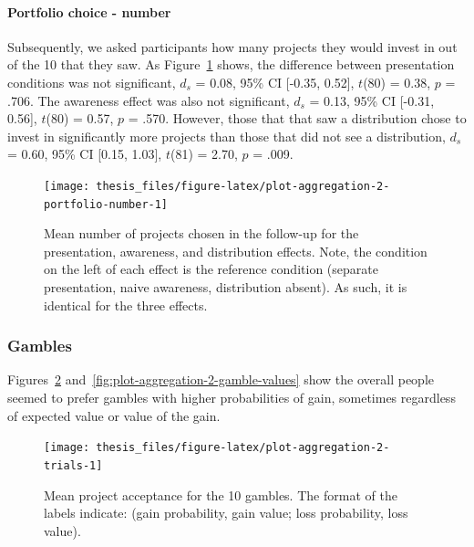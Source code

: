 \documentclass[a4paper, nobind, dvipsnames]{templates/ociamthesis}
\theoremstyle{definition}
\theoremstyle{definition}
\theoremstyle{definition}
\theoremstyle{definition}
\theoremstyle{remark}
\begin{document}
\hypertarget{portfolio-choice---number}{%
\paragraph{Portfolio choice - number}\label{portfolio-choice---number}}

Subsequently, we asked participants how many projects they would invest in out
of the 10 that they saw. As
Figure~\ref{fig:plot-aggregation-2-portfolio-number} shows, the difference
between presentation conditions was not significant,
\(d_s\) = 0.08, 95\% CI {[}-0.35, 0.52{]}, \(t\)(80) = 0.38, \(p\) = .706. The awareness effect
was also not significant, \(d_s\) = 0.13, 95\% CI {[}-0.31, 0.56{]}, \(t\)(80) = 0.57, \(p\) = .570.
However, those that that saw a distribution chose to invest in significantly
more projects than those that did not see a distribution,
\(d_s\) = 0.60, 95\% CI {[}0.15, 1.03{]}, \(t\)(81) = 2.70, \(p\) = .009.



\begin{figure}
\texttt{[image: thesis\_files/figure-latex/plot-aggregation-2-portfolio-number-1]} \caption{Mean number of projects chosen in the follow-up for the presentation, awareness, and distribution effects. Note, the condition on the left of each effect is the reference condition (separate presentation, naive awareness, distribution absent). As such, it is identical for the three effects.}\label{fig:plot-aggregation-2-portfolio-number}
\end{figure}

\hypertarget{gambles}{%
\subsubsection{Gambles}\label{gambles}}

Figures~\ref{fig:plot-aggregation-2-trials}
and~\ref{fig:plot-aggregation-2-gamble-values} show the overall people seemed
to prefer gambles with higher probabilities of gain, sometimes regardless of
expected value or value of the gain.



\begin{figure}
\texttt{[image: thesis\_files/figure-latex/plot-aggregation-2-trials-1]} \caption{Mean project acceptance for the 10 gambles. The format of the labels indicate: (gain probability, gain value; loss probability, loss value).}\label{fig:plot-aggregation-2-trials}
\end{figure}
\end{document}
